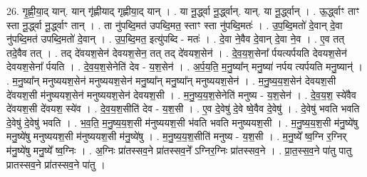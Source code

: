 \documentclass[17pt]{extarticle}
\begin{document}
26. गृ॒ह्णी॒या॒द् यान्. यान् गृ॑ह्णीयाद् गृह्णीया॒द् यान् । . या नू॒र्द्ध्वा नू॒र्द्ध्वान्. यान्. या नू॒र्द्ध्वान् । . ऊ॒र्द्ध्वाꣳ ताꣳ स्ता नू॒र्द्ध्वा नू॒र्द्ध्वाꣳ तान् । . ता नु॑पब्दि॒मत॑ उपब्दि॒मत॒ स्ताꣳ स्ता नु॑पब्दि॒मतः॑ । . उ॒प॒ब्दि॒मतो॑ दे॒वान् दे॒वा नु॑पब्दि॒मत॑ उपब्दि॒मतो॑ दे॒वान् । . उ॒प॒ब्दि॒मत॒ इत्यु॑पब्दि - मतः॑ । . दे॒वा ने॒वैव दे॒वान् दे॒वा ने॒व । . ए॒व तत् तदे॒वैव तत् । . तद् दे॑वयश॒सेन॑ देवयश॒सेन॒ तत् तद् दे॑वयश॒सेन॑ । . दे॒व॒य॒श॒सेना᳚ र्पयत्यर्पयति देवयश॒सेन॑ देवयश॒सेना᳚ र्पयति । . दे॒व॒य॒श॒सेनेति॑ देव - य॒श॒सेन॑ । . अ॒र्प॒य॒ति॒ म॒नु॒ष्या᳚न् मनु॒ष्या॑ नर्पय त्यर्पयति मनु॒ष्यान्॑ । . म॒नु॒ष्या᳚न् मनुष्ययश॒सेन॑ मनुष्ययश॒सेन॑ मनु॒ष्या᳚न् मनु॒ष्या᳚न् मनुष्ययश॒सेन॑ । . म॒नु॒ष्य॒य॒श॒सेन॑ देवयश॒सी दे॑वयश॒सी म॑नुष्ययश॒सेन॑ मनुष्ययश॒सेन॑ देवयश॒सी । . म॒नु॒ष्य॒य॒श॒सेनेति॑ मनुष्य - य॒श॒सेन॑ । . दे॒व॒य॒श॒ स्ये॑वैव दे॑वयश॒सी दे॑वयश॒ स्ये॑व । . दे॒व॒य॒श॒सीति॑ देव - य॒श॒सी । . ए॒व दे॒वेषु॑ दे॒वे ष्वे॒वैव दे॒वेषु॑ । . दे॒वेषु॑ भवति भवति दे॒वेषु॑ दे॒वेषु॑ भवति । . भ॒व॒ति॒ म॒नु॒ष्य॒य॒श॒सी म॑नुष्ययश॒सी भ॑वति भवति मनुष्ययश॒सी । . म॒नु॒ष्य॒य॒श॒सी म॑नु॒ष्ये॑षु मनु॒ष्ये॑षु मनुष्ययश॒सी म॑नुष्ययश॒सी म॑नु॒ष्ये॑षु । . म॒नु॒ष्य॒य॒श॒सीति॑ मनुष्य - य॒श॒सी । . म॒नु॒ष्ये᳚ ष्व॒ग्नि र॒ग्निर् म॑नु॒ष्ये॑षु मनु॒ष्ये᳚ ष्व॒ग्निः । . अ॒ग्निः प्रा॑तस्सव॒ने प्रा॑तस्सव॒ने᳚ ऽग्निर॒ग्निः प्रा॑तस्सव॒ने । . प्रा॒त॒स्स॒व॒ने पा॑तु पातु प्रातस्सव॒ने प्रा॑तस्सव॒ने पा॑तु । \newline
\end{document}
